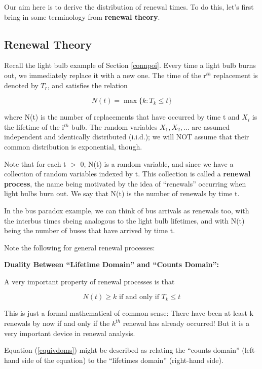 Our aim here is to derive the distribution of renewal times.  To do
this, let's first bring in some terminology from {\bf renewal theory}.

\subsection{Renewal Theory}

Recall the light bulb example of Section \ref{connpoi}.  Every time a
light bulb burns out, we immediately replace it with a new one.  The
time of the r$^{th}$ replacement is denoted by $T_r$, and satisfies the
relation

\begin{equation}
N(t) = \max\{k: T_k \leq t\}
\end{equation}

where N(t) is the number of replacements that have occurred by time t
and $X_i$ is the lifetime of the i$^{th}$ bulb.  The random variables
$X_1, X_2,...$ are assumed independent and identically distributed
(i.i.d.); we will NOT assume that their common distribution is
exponential, though.

Note that for each t $>$ 0, N(t) is a random variable, and since we have
a collection of random variables indexed by t.  This collection is
called a {\bf renewal process}, the name being motivated by the idea of
``renewals'' occurring when light bulbs burn out.  We say that N(t) is
the number of renewals by time t.

In the bus paradox example, we can think of bus arrivals as renewals
too, with the interbus times sbeing analogous to the light bulb
lifetimes, and with N(t) being the number of buses that have arrived by
time t.

Note the following for general renewal processes:

{\bf Duality Between ``Lifetime Domain'' and ``Counts Domain'':}

A very important property of renewal processes is that

\begin{equation}
\label{equivdoms}
N(t) \geq k  \textrm{ if and only if } T_k \leq t
\end{equation}

This is just a formal mathematical of common sense:  There have been at
least k renewals by now if and only if the $k^{th}$ renewal has already
occurred!  But it is a very important device in renewal analysis.

Equation (\ref{equivdoms}) might be described as relating the ``counts
domain'' (left-hand side of the equation) to the ``lifetimes domain''
(right-hand side).

